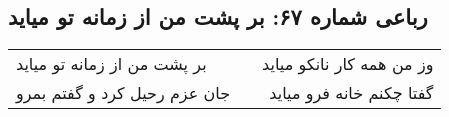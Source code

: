 \begin{center}
\section*{رباعی شماره ۶۷: بر پشت من از زمانه تو میاید}
\label{sec:sh067}
\begin{longtable}{l p{0.5cm} r}
بر پشت من از زمانه تو میاید
&&
وز من همه کار نانکو میاید
\\
جان عزم رحیل کرد و گفتم بمرو
&&
گفتا چکنم خانه فرو میاید
\\
\end{longtable}
\end{center}
